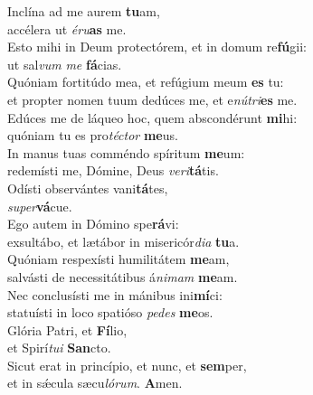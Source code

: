 \evenverse Inclína ad me aurem \textbf{tu}am,~\*\\
\evenverse accélera ut \textit{é}\textit{ru}\textbf{as} me.\\
\oddverse Esto mihi in Deum protectórem, et in domum re\textbf{fú}gii:~\*\\
\oddverse ut sal\textit{vum} \textit{me} \textbf{fá}cias.\\
\evenverse Quóniam fortitúdo mea, et refúgium meum \textbf{es} tu:~\*\\
\evenverse et propter nomen tuum dedúces me, et e\textit{nú}\textit{tri}\textbf{es} me.\\
\oddverse Edúces me de láqueo hoc, quem abscondérunt \textbf{mi}hi:~\*\\
\oddverse quóniam tu es pro\textit{té}\textit{ctor} \textbf{me}us.\\
\evenverse In manus tuas comméndo spíritum \textbf{me}um:~\*\\
\evenverse redemísti me, Dómine, Deus \textit{ve}\textit{ri}\textbf{tá}tis.\\
\oddverse Odísti observántes vani\textbf{tá}tes,~\*\\
\oddverse \textit{su}\textit{per}\textbf{vá}cue.\\
\evenverse Ego autem in Dómino spe\textbf{rá}vi:~\*\\
\evenverse exsultábo, et lætábor in misericór\textit{di}\textit{a} \textbf{tu}a.\\
\oddverse Quóniam respexísti humilitátem \textbf{me}am,~\*\\
\oddverse salvásti de necessitátibus á\textit{ni}\textit{mam} \textbf{me}am.\\
\evenverse Nec conclusísti me in mánibus ini\textbf{mí}ci:~\*\\
\evenverse statuísti in loco spatióso \textit{pe}\textit{des} \textbf{me}os.\\
\oddverse Glória Patri, et \textbf{Fí}lio,~\*\\
\oddverse et Spirí\textit{tu}\textit{i} \textbf{San}cto.\\
\evenverse Sicut erat in princípio, et nunc, et \textbf{sem}per,~\*\\
\evenverse et in sǽcula sæcu\textit{ló}\textit{rum}. \textbf{A}men.\\
